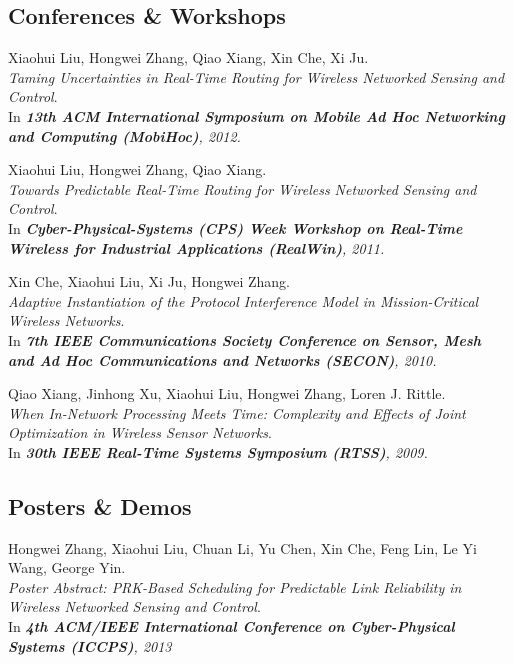 \subsection{Conferences \& Workshops}
\begin{thebibliography}{4}
Xiaohui Liu, Hongwei Zhang, Qiao Xiang, Xin Che, Xi Ju.
\\ \newblock \emph{Taming Uncertainties in Real-Time Routing for Wireless Networked Sensing and Control}.
\\ \newblock In \emph{\textbf{13th ACM International Symposium on Mobile Ad Hoc Networking and Computing (MobiHoc)}, 2012.}

Xiaohui Liu, Hongwei Zhang, Qiao Xiang.
\\ \newblock \emph{Towards Predictable Real-Time Routing for Wireless Networked Sensing and Control}.
\\ \newblock In \emph{\textbf{Cyber-Physical-Systems (CPS) Week Workshop on Real-Time Wireless for Industrial Applications (RealWin)}, 2011.}

Xin Che, Xiaohui Liu, Xi Ju, Hongwei Zhang.
\\ \newblock \emph{Adaptive Instantiation of the Protocol Interference Model in Mission-Critical Wireless Networks}.
\\ \newblock In \emph{\textbf{7th IEEE Communications Society Conference on Sensor, Mesh and Ad Hoc Communications and Networks (SECON)}, 2010.}

Qiao Xiang, Jinhong Xu, Xiaohui Liu, Hongwei Zhang, Loren J. Rittle.
\\ \newblock \emph{When In-Network Processing Meets Time: Complexity and Effects of Joint Optimization in Wireless Sensor Networks}.
\\ \newblock In \emph{\textbf{30th IEEE Real-Time Systems Symposium (RTSS)}, 2009.}

\end{thebibliography}


\subsection{Posters \& Demos}
\begin{thebibliography}{1}
Hongwei Zhang, Xiaohui Liu, Chuan Li, Yu Chen, Xin Che, Feng Lin, Le Yi Wang, George Yin.
\\ \newblock \emph{Poster Abstract: PRK-Based Scheduling for Predictable Link Reliability in Wireless Networked Sensing and Control}.
\\ \newblock In \emph{\textbf{4th ACM/IEEE International Conference on Cyber-Physical Systems (ICCPS)}, 2013}

\end{thebibliography}

